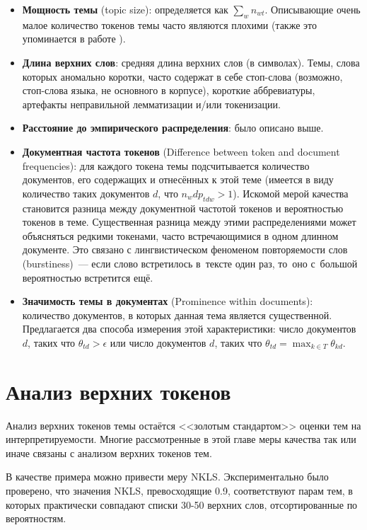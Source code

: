 \begin{itemize}
    \item \textbf{Мощность темы} (topic size): определяется как $\sum_w n_{wt}$. Описывающие очень малое количество токенов темы часто являются плохими (также это упоминается в работе \cite{mimno2011}).
    \item \textbf{Длина верхних слов}: средняя длина верхних слов (в символах). Темы, слова которых аномально коротки, часто содержат в себе стоп-слова (возможно, стоп-слова языка, не основного в корпусе), короткие аббревиатуры, артефакты неправильной лемматизации и/или токенизации.
    \item{\textbf{Расстояние до эмпирического распределения}: было описано выше.}
    \item{\textbf{Документная частота токенов} (Difference between token and document frequencies): для каждого токена темы подсчитывается количество документов, его содержащих и отнесённых к этой теме (имеется в виду количество таких документов $d$, что $n_wd p_{tdw} > 1$).
    Искомой мерой качества становится разница между документной частотой токенов и вероятностью токенов в теме. Существенная разница между этими распределениями может объясняться редкими токенами, часто встречающимися в одном длинном документе. Это связано с лингвистическом феноменом повторяемости слов (burstiness)~--- если слово встретилось в~тексте один раз, то~оно с~большой вероятностью встретится ещё.}
    \item{\textbf{Значимость темы в документах} (Prominence within documents): количество документов, в которых данная тема является существенной. Предлагается два способа измерения этой характеристики: число документов $d$, таких что $\theta_{td} > \epsilon$ или число документов $d$, таких что $\theta_{td} = \max_{k \in T} \theta_{kd}$.}
\end{itemize}

\section{Анализ верхних токенов}
\label{sec:toptokens}

Анализ верхних токенов темы остаётся <<золотым стандартом>> оценки тем на интерпретируемости. Многие рассмотренные в этой главе меры качества так или иначе связаны с анализом верхних токенов тем.

В качестве примера можно привести меру NKLS. Экспериментально было проверено, что значения NKLS, превосходящие 0.9, соответствуют парам тем, в которых практически совпадают списки 30-50 верхних слов, отсортированные по вероятностям.

